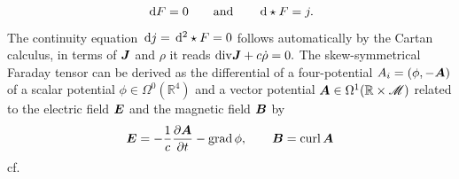 \begin{beispiel}
	\begin{equation}
		\,\mathrm{d} F = 0 
		\qquad \mbox{and} \qquad
		\,\mathrm{d} \star F = j
		.
		\label{eq:Maxwell-equations-in-Cartan-calculus}
	\end{equation}
	The continuity equation $\,\mathrm{d} j = \,\mathrm{d}^2 \star F = 0$ follows automatically by the Cartan calculus, in terms of $\mbox{$\boldsymbol{J}$}$ and $\rho$ it reads
	$\mathrm{div} \mbox{$\boldsymbol{J}$} + c\dot{\rho} = 0.$
	The skew-symmetrical Faraday tensor can be derived as the differential of a four-potential $A_i = (\phi, -\mbox{$\boldsymbol{A}$})$ of a scalar potential $\phi  \in \Omega^0(\mathbb{R}^4)$ and a vector potential $\mbox{$\boldsymbol{A}$} \in \Omega^1(\mathbb{R} \times \mathscr{M})$ related to the electric field $\mbox{$\boldsymbol{E}$}$ and the magnetic field $\mbox{$\boldsymbol{B}$}$ by
	\begin{equation}
		\mbox{$\boldsymbol{E}$} = - \frac{1}{c} \frac{\partial \mbox{$\boldsymbol{A}$}}{\partial t} - 
		\operatorname{grad} 
		\phi,
		\qquad
		\mbox{$\boldsymbol{B}$} = 
		\operatorname{curl} 
		\mbox{$\boldsymbol{A}$}
	\end{equation}
	cf. \cite[53,57,73]{Landau-Lifschitz-1997}
\end{beispiel}


